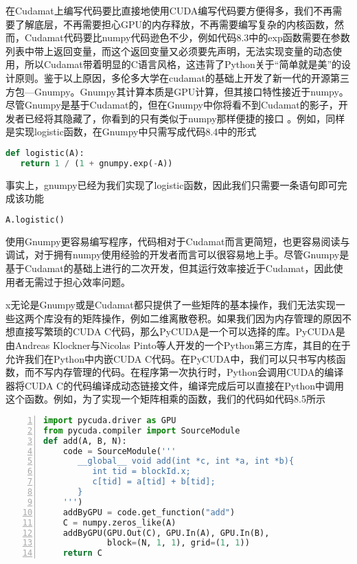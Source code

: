 在Cudamat上编写代码要比直接地使用CUDA编写代码要方便得多，我们不再需要了解底层，不再需要担心GPU的内存释放，不再需要编写复杂的内核函数，然而，Cudamat代码要比numpy代码逊色不少，例如代码8.3中的exp函数需要在参数列表中带上返回变量，而这个返回变量又必须要先声明，无法实现变量的动态使用，所以Cudamat带着明显的C语言风格，这违背了Python关于“简单就是美”的设计原则。鉴于以上原因，多伦多大学在cudamat的基础上开发了新一代的开源第三方包---Gnumpy。Gnumpy其计算本质是GPU计算，但其接口特性接近于numpy。尽管Gnumpy是基于Cudamat的，但在Gnumpy中你将看不到Cudamat的影子，开发者已经将其隐藏了，你看到的只有类似于numpy那样便捷的接口	。例如，同样是实现logistic函数，在Gnumpy中只需写成代码8.4中的形式

\begin{lstlisting}[language=Python,  frame=shadowbox, rulesepcolor=\color{cadegrey}, caption=\text{Gnumpy中logistic的实现}]
def logistic(A):
   return 1 / (1 + gnumpy.exp(-A))
\end{lstlisting}

事实上，gnumpy已经为我们实现了logistic函数，因此我们只需要一条语句即可完成该功能
\begin{lstlisting}[language=Python, frame=shadowbox, rulesepcolor=\color{cadegrey}]
A.logistic()
\end{lstlisting}

使用Gnumpy更容易编写程序，代码相对于Cudamat而言更简短，也更容易阅读与调试，对于拥有numpy使用经验的开发者而言可以很容易地上手。尽管Gnumpy是基于Cudamat的基础上进行的二次开发，但其运行效率接近于Cudamat，因此使用者无需过于担心效率问题。

x无论是Gnumpy或是Cudamat都只提供了一些矩阵的基本操作，我们无法实现一些这两个库没有的矩阵操作，例如二维离散卷积。如果我们因为内存管理的原因不想直接写繁琐的CUDA C代码，那么PyCUDA是一个可以选择的库。PyCUDA是由Andreas Klockner与Nicolas Pinto等人开发的一个Python第三方库，其目的在于允许我们在Python中内嵌CUDA C代码。在PyCUDA中，我们可以只书写内核函数，而不写内存管理的代码。在程序第一次执行时，Python会调用CUDA的编译器将CUDA C的代码编译成动态链接文件，编译完成后可以直接在Python中调用这个函数。例如，为了实现一个矩阵相乘的函数，我们的代码如代码8.5所示

\newpage
\begin{lstlisting}[language=Python,numbers=left, frame=shadowbox, rulesepcolor=\color{cadegrey}, caption=\text{Pycuda中实现向量相加}]
import pycuda.driver as GPU
from pycuda.compiler import SourceModule
def add(A, B, N):
    code = SourceModule('''
       __global__ void add(int *c, int *a, int *b){
          int tid = blockId.x;
          c[tid] = a[tid] + b[tid];
       }
    ''')
    addByGPU = code.get_function("add")
    C = numpy.zeros_like(A)
    addByGPU(GPU.Out(C), GPU.In(A), GPU.In(B),
             block=(N, 1, 1), grid=(1, 1))
    return C
\end{lstlisting}

